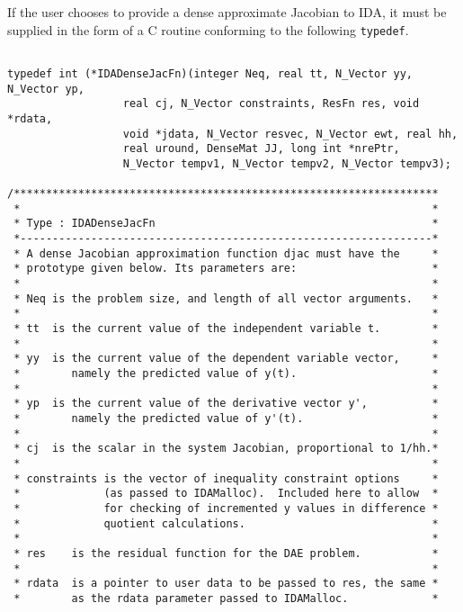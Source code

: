 If the user chooses to provide a dense approximate Jacobian to IDA, it
must be supplied in the form of a C routine conforming to the
following {\tt typedef}.

\small
\begin{verbatim}
  
typedef int (*IDADenseJacFn)(integer Neq, real tt, N_Vector yy, N_Vector yp,
                  real cj, N_Vector constraints, ResFn res, void *rdata,
                  void *jdata, N_Vector resvec, N_Vector ewt, real hh,
                  real uround, DenseMat JJ, long int *nrePtr,
                  N_Vector tempv1, N_Vector tempv2, N_Vector tempv3);
 
/******************************************************************
 *                                                                *           
 * Type : IDADenseJacFn                                           *
 *----------------------------------------------------------------*
 * A dense Jacobian approximation function djac must have the     *
 * prototype given below. Its parameters are:                     *
 *                                                                *
 * Neq is the problem size, and length of all vector arguments.   *
 *                                                                *
 * tt  is the current value of the independent variable t.        *
 *                                                                *
 * yy  is the current value of the dependent variable vector,     *
 *        namely the predicted value of y(t).                     *
 *                                                                *
 * yp  is the current value of the derivative vector y',          *
 *        namely the predicted value of y'(t).                    *
 *                                                                *
 * cj  is the scalar in the system Jacobian, proportional to 1/hh.*
 *                                                                *
 * constraints is the vector of inequality constraint options     *
 *             (as passed to IDAMalloc).  Included here to allow  *
 *             for checking of incremented y values in difference *
 *             quotient calculations.                             *
 *                                                                *
 * res    is the residual function for the DAE problem.           *
 *                                                                *
 * rdata  is a pointer to user data to be passed to res, the same *
 *        as the rdata parameter passed to IDAMalloc.             *

\end{verbatim}
